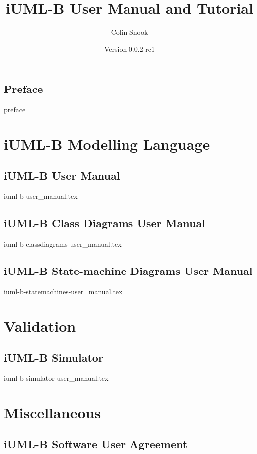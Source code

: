 \documentclass[a4paper,10pt]{book}
\title{iUML-B User Manual and Tutorial}
\author{Colin Snook}
\date{%
  Version 0.0.2 rc1\\%
  \displaydate{iUML-BManualDate}%
}
\begin{document}
\maketitle

\tableofcontents

\chapter*{Preface}
{preface}

\part{iUML-B Modelling Language}

\chapter{iUML-B User Manual}
\label{cha:iuml-b-user}
{iuml-b-user_manual.tex}

\chapter{iUML-B Class Diagrams User Manual}
\label{cha:iuml-b-classdiagram-user}
{iuml-b-classdiagrams-user_manual.tex}

\chapter{iUML-B State-machine Diagrams User Manual}
\label{cha:iuml-b-statemachines-user}
{iuml-b-statemachines-user_manual.tex}


\part{Validation}

\chapter{iUML-B Simulator}
\label{cha:iuml-b-simulator}
{iuml-b-simulator-user_manual.tex}


\part{Miscellaneous}
\label{part:miscellaneous}

\chapter{iUML-B Software User Agreement}
\label{cha:iuml-b-software-user-agreement}

\end{document}
